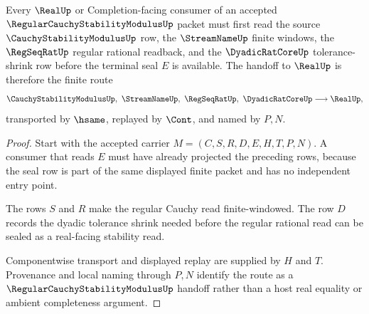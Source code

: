 \begin{theorem}
\label{thm:regular-cauchy-stability-modulus-real-seal-handoff}
Every $\RealUp$ or Completion-facing consumer of an accepted $\RegularCauchyStabilityModulusUp$ packet must first read the source $\CauchyStabilityModulusUp$ row, the $\StreamNameUp$ finite windows, the $\RegSeqRatUp$ regular rational readback, and the $\DyadicRatCoreUp$ tolerance-shrink row before the terminal seal $E$ is available. The handoff to $\RealUp$ is therefore the finite route
$$
\CauchyStabilityModulusUp,\ \StreamNameUp,\ \RegSeqRatUp,\ \DyadicRatCoreUp \longrightarrow \RealUp ,
$$
transported by $\hsame$, replayed by $\Cont$, and named by $P,N$.
\end{theorem}
\begin{proof}
Start with the accepted carrier $M=(C,S,R,D,E,H,T,P,N)$. A consumer that reads $E$ must have already projected the preceding rows, because the seal row is part of the same displayed finite packet and has no independent entry point.

The rows $S$ and $R$ make the regular Cauchy read finite-windowed. The row $D$ records the dyadic tolerance shrink needed before the regular rational read can be sealed as a real-facing stability read.

Componentwise transport and displayed replay are supplied by $H$ and $T$. Provenance and local naming through $P,N$ identify the route as a $\RegularCauchyStabilityModulusUp$ handoff rather than a host real equality or ambient completeness argument.
\end{proof}


\begin{closurestatus}{\RegularCauchyStabilityModulusUp}
  \theoryclosure{\seedClosure}
  \formalstatus{\unformalizedV}
\end{closurestatus}
